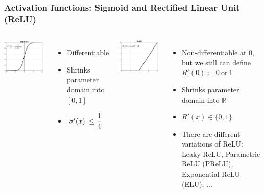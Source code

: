 \documentclass[12pt, aspectratio = 169]{beamer}
\begin{document}

\begin{frame}[t]
	\frametitle{Activation functions: Sigmoid and Rectified Linear Unit (ReLU)}
	\vspace{0.5em}
	\begin{columns}[T]
		\begin{minipage}[T]{\linewidth}
			\centering
				\vspace{-1em}\includegraphics[width=0.5\linewidth]{sigmoid.png}\\
			\begin{itemize}
				\item Differentiable
				\item Shrinks parameter domain into $[0,1]$
				\item $|\sigma'(x)| \leq \cfrac{1}{4}$
			\end{itemize}%
		\end{minipage}%
		\begin{minipage}[T]{\linewidth}
			\centering
			\vspace{-1em}\includegraphics[width=0.5\linewidth]{relu.png}\\
			\begin{itemize}
				\item Non-differentiable at 0, but we still can define $R'(0) \coloneqq 0~\text{or}~1$
				\item Shrinks parameter domain into $\mathbb{R^+}$\\
				\item $R'(x)\in \{0,1\}$
				\item There are different variations of ReLU: Leaky ReLU, Parametric ReLU (PReLU), Exponential ReLU (ELU), ...
			\end{itemize}
		\end{minipage}
	\end{columns}
\end{frame}
\end{document}

